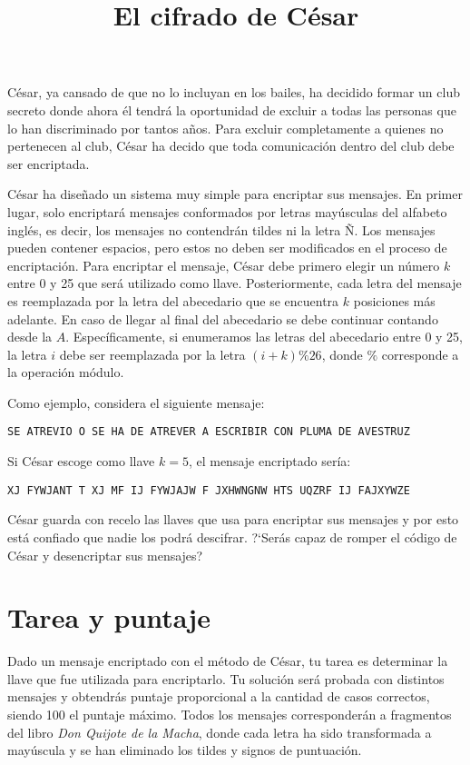 \documentclass{oci}
\title{El cifrado de César}
\begin{document}
\begin{problemDescription}
César, ya cansado de que no lo incluyan en los bailes, ha decidido formar un club secreto
donde ahora él tendrá la oportunidad de excluir a todas las personas que lo han discriminado por
tantos años.
Para excluir completamente a quienes no pertenecen al club, César ha decido que toda comunicación
dentro del club debe ser encriptada.

César ha diseñado un sistema muy simple para encriptar sus mensajes.
En primer lugar, solo encriptará mensajes conformados por letras mayúsculas del alfabeto
inglés, es decir, los mensajes no contendrán tildes ni la letra Ñ.
Los mensajes pueden contener espacios, pero estos no deben ser modificados en el proceso de
encriptación.
Para encriptar el mensaje, César debe primero elegir un número $k$ entre 0 y 25 que será
utilizado como llave.
Posteriormente, cada letra del mensaje es reemplazada por la letra del abecedario que se
encuentra $k$ posiciones más adelante.
En caso de llegar al final del abecedario se debe continuar contando desde la $A$.
Específicamente, si enumeramos las letras del abecedario entre 0 y 25, la letra $i$ debe ser
reemplazada por la letra $(i+k)\% 26$, donde $\%$ corresponde a la operación módulo.

Como ejemplo, considera el siguiente mensaje:
\begin{center}
  \texttt{SE ATREVIO O SE HA DE ATREVER A ESCRIBIR CON PLUMA DE AVESTRUZ}
\end{center}
Si César escoge como llave $k=5$, el mensaje encriptado sería:
\begin{center}
  \texttt{XJ FYWJANT T XJ MF IJ FYWJAJW F JXHWNGNW HTS UQZRF IJ FAJXYWZE}
\end{center}

César guarda con recelo las llaves que usa para encriptar sus mensajes y por esto
está confiado que nadie los podrá descifrar.
?`Serás capaz de romper el código de César y desencriptar sus mensajes?

\end{problemDescription}

\section*{Tarea y puntaje}
Dado un mensaje encriptado con el método de César, tu tarea es determinar la llave que fue
utilizada para encriptarlo.
Tu solución será probada con distintos mensajes y obtendrás puntaje proporcional a la cantidad
de casos correctos, siendo 100 el puntaje máximo.
Todos los mensajes corresponderán a fragmentos del libro \emph{Don Quijote de la Macha}, donde
cada letra ha sido transformada a mayúscula y se han eliminado los tildes
y signos de puntuación.
\end{document}

